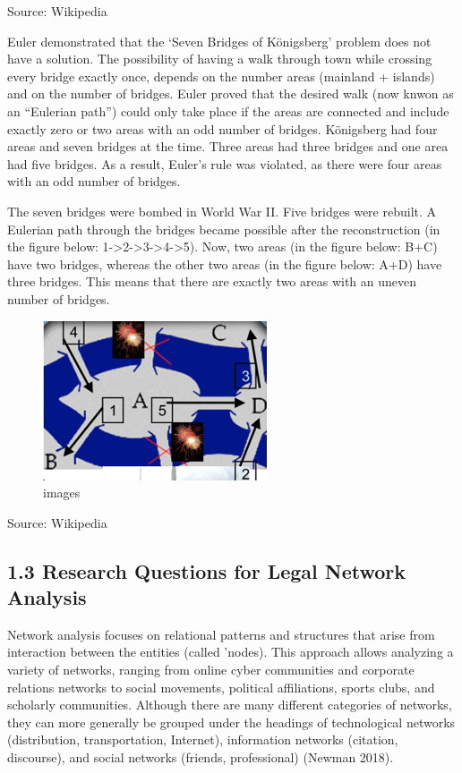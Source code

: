 Source: Wikipedia

    Euler demonstrated that the `Seven Bridges of Königsberg' problem does
not have a solution. The possibility of having a walk through town while
crossing every bridge exactly once, depends on the number areas
(mainland + islands) and on the number of bridges. Euler proved that the
desired walk (now knwon as an ``Eulerian path'') could only take place
if the areas are connected and include exactly zero or two areas with an
odd number of bridges. Königsberg had four areas and seven bridges at
the time. Three areas had three bridges and one area had five bridges.
As a result, Euler's rule was violated, as there were four areas with an
odd number of bridges.

The seven bridges were bombed in World War II. Five bridges were
rebuilt. A Eulerian path through the bridges became possible after the
reconstruction (in the figure below:
1-\textgreater2-\textgreater3-\textgreater4-\textgreater5). Now, two
areas (in the figure below: B+C) have two bridges, whereas the other two
areas (in the figure below: A+D) have three bridges. This means that
there are exactly two areas with an uneven number of bridges.

\begin{figure}
\centering
\includegraphics{images/ch1/konisberg_bridges_4.png}
\caption{images}
\end{figure}

Source: Wikipedia

    \hypertarget{research-questions-for-legal-network-analysis}{%
\subsection{1.3 Research Questions for Legal Network
Analysis}\label{research-questions-for-legal-network-analysis}}

Network analysis focuses on relational patterns and structures that
arise from interaction between the entities (called 'nodes). This
approach allows analyzing a variety of networks, ranging from online
cyber communities and corporate relations networks to social movements,
political affiliations, sports clubs, and scholarly communities.
Although there are many different categories of networks, they can more
generally be grouped under the headings of technological networks
(distribution, transportation, Internet), information networks
(citation, discourse), and social networks (friends, professional)
(Newman 2018).

